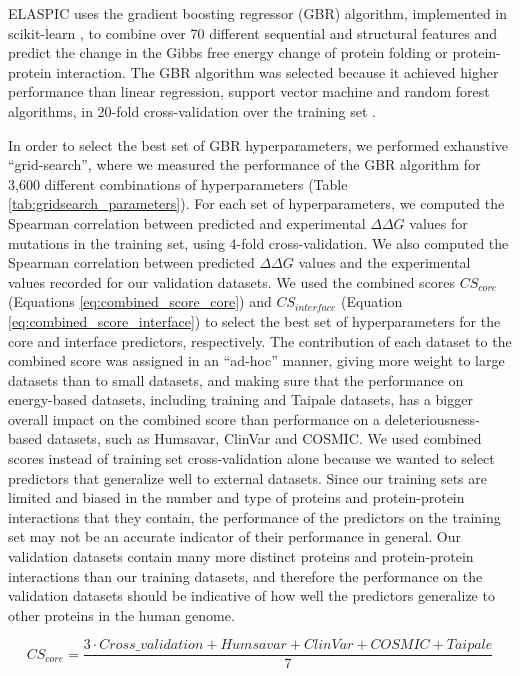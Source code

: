 ELASPIC uses the gradient boosting regressor (GBR) algorithm, implemented in scikit-learn \cite{scikit-learn}, to  combine over 70 different sequential and structural features and predict the change in the Gibbs free energy change of protein folding or protein-protein interaction. The GBR algorithm was selected because it achieved higher performance than linear regression, support vector machine and random forest algorithms, in 20-fold cross-validation over the training set \cite{berliner_combining_2014}.

In order to select the best set of GBR hyperparameters, we performed exhaustive ``grid-search'', where we measured the performance of the GBR algorithm for 3,600 different combinations of hyperparameters (Table \ref{tab:gridsearch_parameters}). For each set of hyperparameters, we computed the Spearman correlation between predicted and experimental $\Delta \Delta G$ values for mutations in the training set, using 4-fold cross-validation. We also computed the Spearman correlation between predicted $\Delta \Delta G$ values and the experimental values recorded for our validation datasets. We used the combined scores $CS_{core}$ (Equations \ref{eq:combined_score_core}) and $CS_{interface}$ (Equation \ref{eq:combined_score_interface}) to select the best set of hyperparameters for the core and interface predictors, respectively. The contribution of each dataset to the combined score was assigned in an ``ad-hoc'' manner, giving more weight to large datasets than to small datasets, and making sure that the performance on energy-based datasets, including training and Taipale datasets, has a bigger overall impact on the combined score than performance on a deleteriousness-based datasets, such as Humsavar, ClinVar and COSMIC. We used combined scores instead of training set cross-validation alone because we wanted to select predictors that generalize well to external datasets. Since our training sets are limited and biased in the number and type of proteins and protein-protein interactions that they contain, the performance of the predictors on the training set may not be an accurate indicator of their performance in general. Our validation datasets contain many more distinct proteins and protein-protein interactions than our training datasets, and therefore the performance on the validation datasets should be indicative of how well the predictors generalize to other proteins in the human genome.

\begin{equation} \label{eq:combined_score_core}
    CS_{core} = \frac{3 \cdot Cross\_validation + Humsavar + ClinVar + COSMIC + Taipale}{7}
\end{equation}

